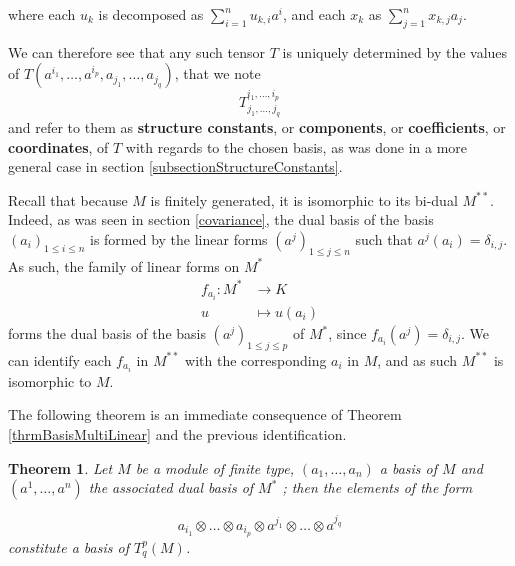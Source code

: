 \documentclass{report}
\newtheorem{thrm}{Theorem}
\theoremstyle{definition}
\theoremstyle{remark}
\begin{document}
where each $u_k$ is decomposed as $\sum_{i = 1}^n u_{k,i}a^{i}$, and each $x_k$ as $\sum_{j=1}^n x_{k,j} a_{j}$.

\bigskip
We can therefore see that any such tensor $T$ is uniquely determined by the values of $T(a^{i_1},\dots,a^{i_p},a_{j_1},\dots,a_{j_q})$, that we note $$T^{i_1,\dots,i_p}_{j_1,\dots,j_q}$$ and refer to them as \textbf{structure constants}, or \textbf{components}, or \textbf{coefficients}, or \textbf{coordinates}, of $T$ with regards to the chosen basis, as was done in a more general case in section \ref{subsectionStructureConstants}.

\bigskip
Recall that because $M$ is finitely generated, it is isomorphic to its bi-dual $M^{**}$. Indeed, as was seen in section \ref{covariance}, the dual basis of the basis $(a_i)_{1 \leq i \leq n}$ is formed by the linear forms $(a^j)_{1 \leq j \leq n}$ such that $a^j(a_i) = \delta_{i,j}$. As such, the family of linear forms on $M^*$ 
\begin{equation*}
    \begin{split}
        f_{a_i}: M^* & \to K \\
            u & \mapsto u(a_i)                 
    \end{split}
\end{equation*}
forms the dual basis of the basis $(a^j)_{1 \leq j \leq p}$ of $M^*$, since $f_{a_i}(a^j) = \delta_{i,j}$. We can identify each $f_{a_i}$ in $M^{**}$ with the corresponding $a_i$ in $M$, and as such $M^{**}$ is isomorphic to $M$.

The following theorem is an immediate consequence of Theorem \ref{thrmBasisMultiLinear} and the previous identification. 

\begin{thrm}
        Let $M$ be a module of finite type, $(a_1,\dots,a_n)$ a basis of $M$ and $(a^1,\dots,a^n)$ the associated dual basis of $M^*$ ; then the elements of the form
  
        \begin{equation*}
                a_{i_1} \otimes \dots \otimes a_{i_p} \otimes a^{j_1} \otimes \dots \otimes a^{j_q}
        \end{equation*} constitute a basis of $T^p_q(M)$.
\end{thrm}






\end{document}

